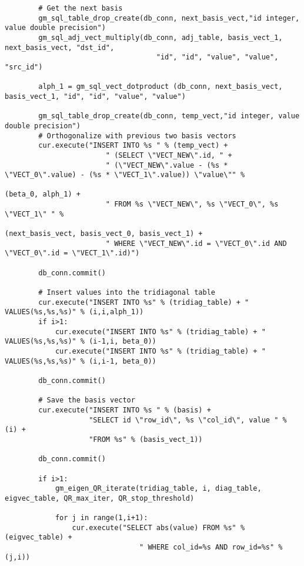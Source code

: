 \documentclass[11pt]{article}
\begin{document}
\begin{lstlisting}
        # Get the next basis
        gm_sql_table_drop_create(db_conn, next_basis_vect,"id integer, value double precision")
        gm_sql_adj_vect_multiply(db_conn, adj_table, basis_vect_1, next_basis_vect, "dst_id", 
                                    "id", "id", "value", "value", "src_id")
                                    
        alph_1 = gm_sql_vect_dotproduct (db_conn, next_basis_vect, basis_vect_1, "id", "id", "value", "value")
        
        gm_sql_table_drop_create(db_conn, temp_vect,"id integer, value double precision")
        # Orthogonalize with previous two basis vectors
        cur.execute("INSERT INTO %s " % (temp_vect) +
                        " (SELECT \"VECT_NEW\".id, " +
                        " (\"VECT_NEW\".value - (%s * \"VECT_0\".value) - (%s * \"VECT_1\".value)) \"value\"" % 
                                                                (beta_0, alph_1) + 
                        " FROM %s \"VECT_NEW\", %s \"VECT_0\", %s \"VECT_1\" " % 
                                                                (next_basis_vect, basis_vect_0, basis_vect_1) +
                        " WHERE \"VECT_NEW\".id = \"VECT_0\".id AND \"VECT_0\".id = \"VECT_1\".id)")
        
        db_conn.commit()
        
        # Insert values into the tridiagonal table
        cur.execute("INSERT INTO %s" % (tridiag_table) + " VALUES(%s,%s,%s)" % (i,i,alph_1))
        if i>1:
            cur.execute("INSERT INTO %s" % (tridiag_table) + " VALUES(%s,%s,%s)" % (i-1,i, beta_0))
            cur.execute("INSERT INTO %s" % (tridiag_table) + " VALUES(%s,%s,%s)" % (i,i-1, beta_0))
            
        db_conn.commit()
        
        # Save the basis vector
        cur.execute("INSERT INTO %s " % (basis) +
                    "SELECT id \"row_id\", %s \"col_id\", value " % (i) +
                    "FROM %s" % (basis_vect_1))
        
        db_conn.commit()  
        
        if i>1:
            gm_eigen_QR_iterate(tridiag_table, i, diag_table, eigvec_table, QR_max_iter, QR_stop_threshold)

            for j in range(1,i+1):
                cur.execute("SELECT abs(value) FROM %s" % (eigvec_table) + 
                                " WHERE col_id=%s AND row_id=%s" % (j,i))
                

\end{lstlisting}
\end{document}
